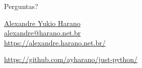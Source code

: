 \documentclass[11pt]{beamer}
\begin{document}
\begin{frame}[standout]
  \vspace*{2cm}
  \huge{Perguntas?}
  \begin{block}{}
    \vspace*{2cm}
    \begin{flushright}
      \large{\href{https://alexandre.harano.net.br/}{Alexandre Yukio Harano}} \\ \vspace*{0.1cm}
      \small{\href{mailto:alexandre@harano.net.br}{alexandre@harano.net.br}} \\
      \small{\url{https://alexandre.harano.net.br/}}
    \end{flushright}
    \vspace*{.2cm}
    \begin{flushleft}
      \normalsize{\url{https://github.com/ayharano/just-python/}}
    \end{flushleft}
  \end{block}
\end{frame}
\end{document}

